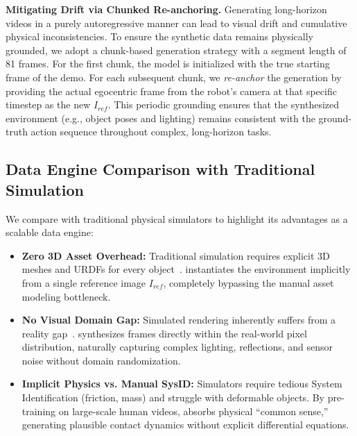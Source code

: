 \noindent 
\textbf{Mitigating Drift via Chunked Re-anchoring.} Generating long-horizon videos in a purely autoregressive manner can lead to visual drift and cumulative physical inconsistencies. To ensure the synthetic data remains physically grounded, we adopt a chunk-based generation strategy with a segment length of 81 frames. For the first chunk, the model is initialized with the true starting frame of the demo. For each subsequent chunk, we \textit{re-anchor} the generation by providing the actual egocentric frame from the robot's camera at that specific timestep as the new $I_{ref}$. This periodic grounding ensures that the synthesized environment (e.g., object poses and lighting) remains consistent with the ground-truth action sequence throughout complex, long-horizon tasks.


\subsection{Data Engine Comparison with Traditional Simulation}
\label{sec:sim_comparison}

We compare \our with traditional physical simulators to highlight its advantages as a scalable data engine:

\begin{itemize}[leftmargin=*]
    \item \textbf{Zero 3D Asset Overhead:} Traditional simulation requires explicit 3D meshes and URDFs for every object~\citep{guo2026articulat3d,zhao2025physsplat}. \our instantiates the environment implicitly from a single reference image $I_{ref}$, completely bypassing the manual asset modeling bottleneck.
    \item \textbf{No Visual Domain Gap:} Simulated rendering inherently suffers from a reality gap~\citep{zhao2026towards}. \our synthesizes frames directly within the real-world pixel distribution, naturally capturing complex lighting, reflections, and sensor noise without domain randomization.
    \item \textbf{Implicit Physics vs. Manual SysID:} Simulators require tedious System Identification (friction, mass) and struggle with deformable objects. By pre-training on large-scale human videos, \our absorbs physical ``common sense,'' generating plausible contact dynamics without explicit differential equations.
\end{itemize}






    





















